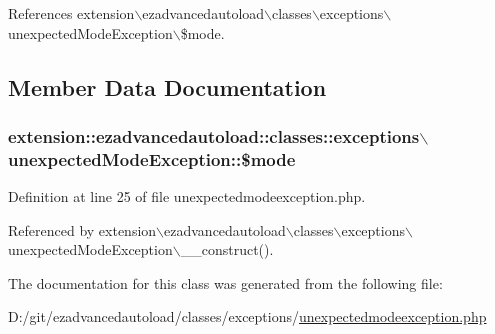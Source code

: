 \-References extension$\backslash$ezadvancedautoload$\backslash$classes$\backslash$exceptions$\backslash$unexpected\-Mode\-Exception$\backslash$\$mode.



\subsection{\-Member \-Data \-Documentation}
\hypertarget{classextension_1_1ezadvancedautoload_1_1classes_1_1exceptions_1_1unexpected_mode_exception_a33b449881502e0ea0461e98b4fe47837}{
\subsubsection[{\$mode}]{\setlength{\rightskip}{0pt plus 5cm}extension\-::ezadvancedautoload\-::classes\-::exceptions$\backslash$unexpected\-Mode\-Exception\-::\$mode}}\label{classextension_1_1ezadvancedautoload_1_1classes_1_1exceptions_1_1unexpected_mode_exception_a33b449881502e0ea0461e98b4fe47837}


\-Definition at line 25 of file unexpectedmodeexception.\-php.



\-Referenced by extension$\backslash$ezadvancedautoload$\backslash$classes$\backslash$exceptions$\backslash$unexpected\-Mode\-Exception$\backslash$\-\_\-\-\_\-construct().



\-The documentation for this class was generated from the following file\-:\begin{DoxyCompactItemize}
\item 
\-D\-:/git/ezadvancedautoload/classes/exceptions/\hyperlink{unexpectedmodeexception_8php}{unexpectedmodeexception.\-php}\end{DoxyCompactItemize}
